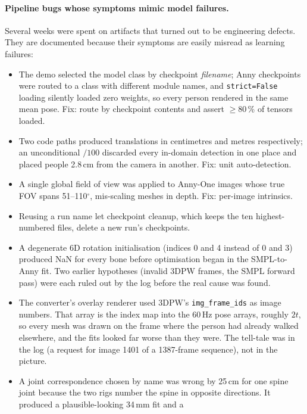 \paragraph{Pipeline bugs whose symptoms mimic model failures.}
\label{sec:pipeline}
Several weeks were spent on artifacts that turned out to be engineering
defects. They are documented because their symptoms are easily misread as
learning failures:
\begin{itemize}
  \item The demo selected the model class by checkpoint \emph{filename};
        Anny checkpoints were routed to a class with different module names,
        and \texttt{strict=False} loading silently loaded zero weights, so every
        person rendered in the same mean pose. Fix: route by checkpoint
        contents and assert $\geq$80\,\% of tensors loaded.
  \item Two code paths produced translations in centimetres and metres
        respectively; an unconditional $/100$ discarded every in-domain
        detection in one place and placed people 2.8\,cm from the camera in
        another. Fix: unit auto-detection.
  \item A single global field of view was applied to Anny-One images whose
        true FOV spans 51--110$^\circ$, mis-scaling meshes in depth. Fix:
        per-image intrinsics.
  \item Reusing a run name let checkpoint cleanup, which keeps the ten
        highest-numbered files, delete a new run's checkpoints.
  \item A degenerate 6D rotation initialisation (indices 0 and 4 instead of 0
        and 3) produced NaN for every bone before optimisation began in the
        SMPL-to-Anny fit. Two earlier hypotheses (invalid 3DPW frames, the
        SMPL forward pass) were each ruled out by the log before the real
        cause was found.
  \item The converter's overlay renderer used 3DPW's \texttt{img\_frame\_ids}
        as image numbers. That array is the index map into the 60\,Hz pose
        arrays, roughly $2t$, so every mesh was drawn on the frame where the
        person had already walked elsewhere, and the fits looked far worse
        than they were. The tell-tale was in the log (a request for image
        1401 of a 1387-frame sequence), not in the picture.
  \item A joint correspondence chosen by name was wrong by 25\,cm for one
        spine joint because the two rigs number the spine in opposite
        directions. It produced a plausible-looking 34\,mm fit and a

\end{itemize}
